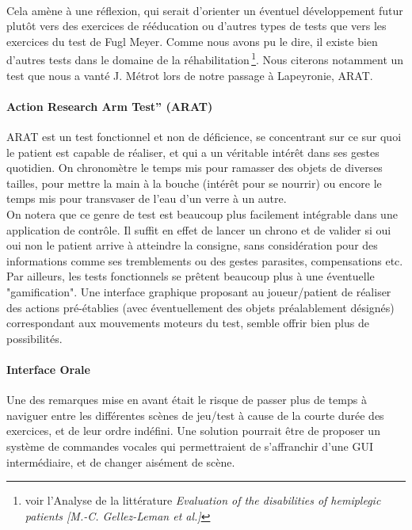 \documentclass[french,12pt]{report}
\begin{document}
\paragraph{}
Cela amène à une réflexion, qui serait d'orienter un éventuel développement futur plutôt vers des exercices de rééducation ou d'autres types de tests que vers les exercices du test de Fugl Meyer. Comme nous avons pu le dire, il existe bien d'autres tests 
dans le domaine de la réhabilitation\,\footnote{voir l'Analyse de la littérature \textit{Evaluation of the disabilities of hemiplegic patients [M.-C. Gellez-Leman et al.]}}. Nous citerons notamment un test que nous a vanté J. Métrot lors de notre passage à 
Lapeyronie, ARAT.
\paragraph{Action Research Arm Test” (ARAT) \\}
ARAT est un test fonctionnel et non de déficience, se concentrant sur ce sur quoi le patient est capable de réaliser, et
qui a un véritable intérêt dans ses gestes quotidien. On chronomètre le temps mis pour ramasser des objets de diverses tailles,
pour mettre la main à la bouche (intérêt pour se nourrir) ou encore le temps mis pour transvaser de l'eau d'un verre à un autre.
\\ On notera que ce genre de test est beaucoup plus facilement intégrable dans une application de contrôle. Il suffit en effet de 
lancer un chrono et de valider si oui oui non le patient arrive à atteindre la consigne, sans considération pour des informations
comme ses tremblements ou des gestes parasites, compensations etc. Par ailleurs, les tests fonctionnels se prêtent beaucoup
plus à une éventuelle "gamification". Une interface graphique proposant au joueur/patient de réaliser des actions pré-établies (avec éventuellement des objets préalablement désignés) correspondant aux mouvements moteurs du test, semble offrir bien
plus de possibilités.

\paragraph{Interface Orale}
Une des remarques mise en avant était le risque de passer plus de temps à naviguer entre les différentes scènes de jeu/test à cause de la courte durée des exercices, et de leur ordre indéfini. Une solution pourrait être de proposer un système de 
commandes vocales qui permettraient de s'affranchir d'une GUI intermédiaire, et de changer aisément de scène.
\end{document}
